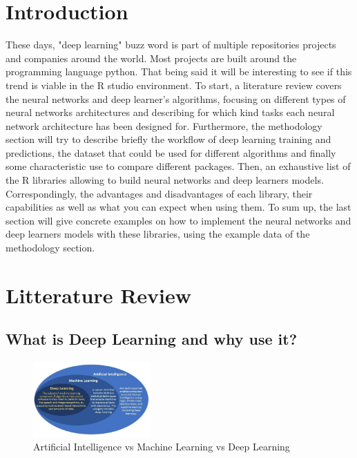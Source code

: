 \documentclass[letter,8pt]{article}\usepackage[]{graphicx}\usepackage[]{color}
\begin{document}
\section{Introduction}
These days, "deep learning" buzz word is part of multiple repositories projects and companies around the world. Most projects are built around the programming language python. That being said it will be interesting to see if this trend is viable in the R studio environment.
To start, a literature review covers the neural networks and deep learner’s algorithms, focusing on different types of neural networks architectures and describing for which kind tasks each neural network architecture has been designed for. Furthermore, the methodology section will try to describe briefly the workflow of deep learning training and predictions, the dataset that could be used for different algorithms and finally some characteristic use to compare different packages. Then, an exhaustive list of the R libraries allowing to build neural networks and deep learners models. Correspondingly, the advantages and disadvantages of each library, their capabilities as well as what you can expect when using them. To sum up, the last section will give concrete examples on how to implement the neural networks and deep learners models with these libraries, using the example data of the methodology section.



\section{Litterature Review}
\subsection{What is Deep Learning and why use it?}
\begin{figure}
  \begin{center}
    \includegraphics[width=0.4\textwidth]{figure/deep learning.PNG}
      \end{center}
     \caption{Artificial Intelligence vs Machine Learning vs Deep Learning \cite{aivsdeepvsml}}
     \label{fig:simule}
\end{figure}
\end{document}

